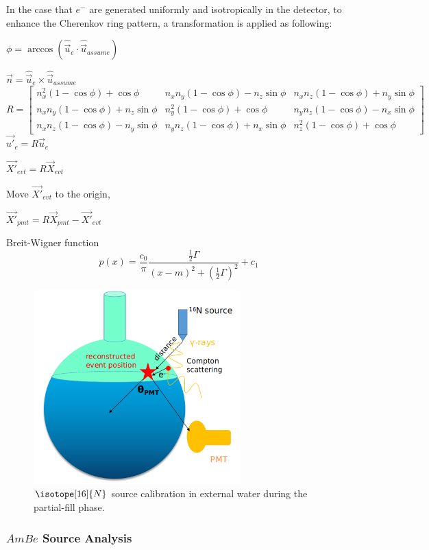 In the case that $e^-$ are generated uniformly and isotropically in the detector, to enhance the 
Cherenkov ring pattern, a transformation is applied as following:

$\phi=\arccos(\hat{\vec{u}}_e\cdot\hat{\vec{u}}_{assume})$

$\vec{n}=\hat{\vec{u}}_e\times\hat{\vec{u}}_{assume}$
\[
R=\begin{bmatrix}
n^2_x(1-\cos\phi)+\cos\phi       &n_xn_y(1-\cos\phi)-n_z\sin\phi & n_xn_z(1-\cos\phi)+n_y\sin\phi \\
n_xn_y(1-\cos\phi)+n_z\sin\phi & n^2_y(1-\cos\phi)+\cos\phi & n_yn_z(1-\cos\phi)-n_x\sin\phi \\
n_xn_z(1-\cos\phi)-n_y\sin\phi & n_yn_z(1-\cos\phi)+n_x\sin\phi & n^2_z(1-\cos\phi)+\cos\phi
\end{bmatrix}
\]
$\vec{u'}_e=R\vec{u}_e$

$\vec{X'}_{evt}=R\vec{X}_{evt}$

Move $\vec{X'}_{evt}$ to the origin,

$\vec{X'}_{pmt}=R\vec{X}_{pmt}-\vec{X'}_{evt}$







Breit-Wigner function
\[
p(x) = \frac{c_0}{\pi}\frac{\frac{1}{2} \Gamma}{(x-m)^2 + (\frac{1}{2} \Gamma)^2}+c_1
\]





\begin{figure}[!htb]
	\centering
	\includegraphics[width=8cm]{partialN16.png}
	\caption{$\isotope[16]{N}$ source calibration in external water during the partial-fill phase.}
	\label{partialN16}
\end{figure}

\subsubsection{$AmBe$ Source Analysis}

